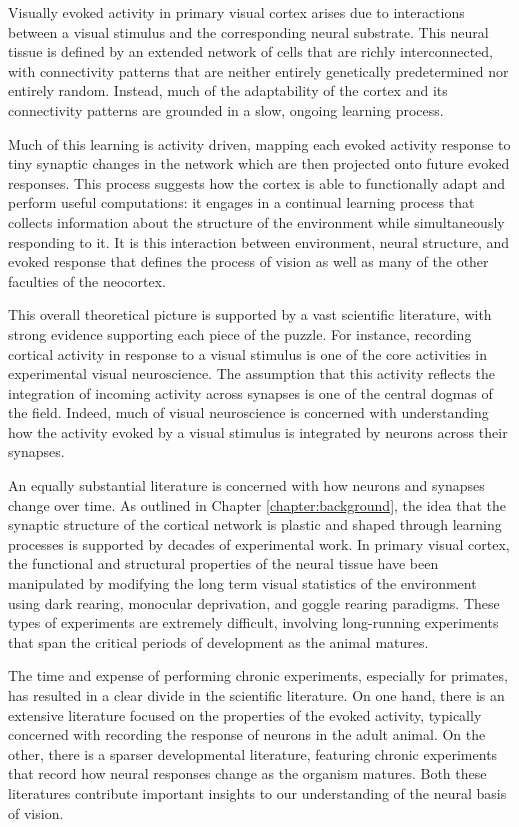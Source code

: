 \documentclass[phd,ianc,twoside]{infthesis}
\begin{document}
Visually evoked activity in primary visual cortex arises due to
interactions between a visual stimulus and the corresponding
neural substrate. This neural tissue is defined by an extended network of
cells that are richly interconnected, with connectivity patterns that
are neither entirely genetically predetermined nor entirely
random. Instead, much of the adaptability of the cortex and its
connectivity patterns are grounded in a slow, ongoing learning process.

Much of this learning is activity driven, mapping each evoked activity
response to tiny synaptic changes in the network which are then
projected onto future evoked responses. This process suggests how the cortex is
able to functionally adapt and perform useful computations: it
engages in a continual learning process that collects information about
the structure of the environment while simultaneously responding to
it. It is this interaction between environment, neural structure, and
evoked response that defines the process of vision as well as many of
the other faculties of the neocortex.

This overall theoretical picture is supported by a vast scientific
literature, with strong evidence supporting each piece of the
puzzle. For instance, recording cortical activity in response to a
visual stimulus is one of the core activities in experimental visual
neuroscience. The assumption that this activity reflects the
integration of incoming activity across synapses is one of the central
dogmas of the field. Indeed, much of visual neuroscience is concerned with
understanding how the activity evoked by a visual stimulus is
integrated by neurons across their synapses.

An equally substantial literature is concerned with how neurons and
synapses change over time. As outlined in Chapter \ref{chapter:background},
the idea that the synaptic structure of the
cortical network is plastic and shaped through learning processes is
supported by decades of experimental work. In primary visual cortex, the
functional and structural properties of the neural tissue have been
manipulated by modifying the long term visual statistics of the
environment using dark rearing, monocular deprivation, and goggle rearing
paradigms. These types of experiments are extremely difficult, involving
long-running experiments that span the critical periods of
development as the animal matures.

The time and expense of performing chronic experiments,
especially for primates, has resulted in a clear divide in the
scientific literature. On one hand, there is an extensive literature
focused on the properties of the evoked activity, typically concerned
with recording the response of neurons in the adult animal. On the
other, there is a sparser developmental literature, featuring chronic
experiments that record how neural responses change as the organism
matures. Both these literatures contribute important insights to our
understanding of the neural basis of vision.
\end{document}
